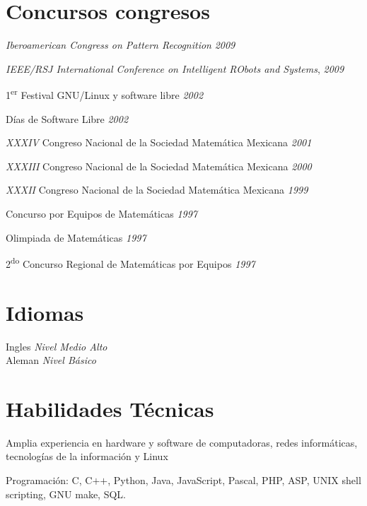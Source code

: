 \section{Concursos congresos} \begin{loneinnerlist}
  \item \emph{Iberoamerican Congress on Pattern Recognition} \hfill{\emph{2009}}
  \item \emph{IEEE/RSJ International Conference on Intelligent RObots
        and Systems}, \hfill{\emph{2009}}
  \item 1\textsuperscript{er} Festival GNU/Linux y software libre
        \hfill{\emph{2002}}
  \item Días de Software Libre \hfill{\emph{2002}}
  \item \emph{XXXIV} Congreso Nacional de la  Sociedad Matemática
        Mexicana \hfill{\emph{2001}}
  \item \emph{XXXIII} Congreso Nacional de la  Sociedad Matemática
        Mexicana \hfill{\emph{2000}}
  \item \emph{XXXII} Congreso Nacional de la  Sociedad Matemática
        Mexicana \hfill{\emph{1999}}
  \item Concurso por Equipos de Matemáticas \hfill{\emph{1997}}
  \item Olimpiada de Matemáticas \hfill{\emph{1997}}
  \item 2\textsuperscript{do} Concurso Regional de Matemáticas por Equipos
        \hfill{\emph{1997}}
\end{loneinnerlist}

\blankline

\section{Idiomas}
%
Ingles \textit{Nivel Medio Alto}\\%
Aleman \textit{Nivel Básico}%

\section{Habilidades Técnicas}
%
Amplia experiencia en hardware y software de computadoras, redes
informáticas, tecnologías de la información y Linux

\blankline

Programación: C, C$+$$+$, Python, Java, JavaScript, Pascal, PHP, ASP, UNIX
        shell scripting, GNU make, SQL.

